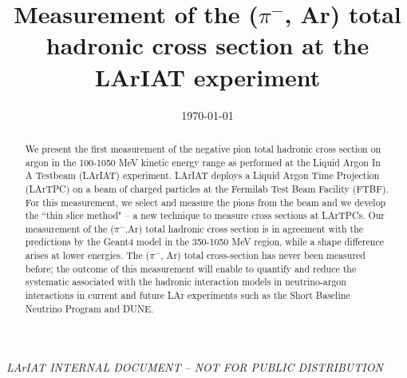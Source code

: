 \documentclass[aps,prl,twocolumn,showpacs,superscriptaddress,groupedaddress]{revtex4}  %
\begin{document}
\widetext
{}
\centerline{\em LArIAT INTERNAL DOCUMENT -- NOT FOR PUBLIC DISTRIBUTION}


\title{Measurement of the ($\pi^-$, Ar) total hadronic cross section at the LArIAT experiment}
\date{\today}


\begin{abstract}
We present the first measurement of the negative pion total hadronic cross section on argon in the 100-1050 MeV kinetic energy range as performed at the Liquid Argon In A Testbeam (LArIAT)  experiment. LArIAT deploys a Liquid Argon Time Projection (LArTPC) on a beam of charged particles at the Fermilab Test Beam Facility (FTBF). 
For this measurement, we select and measure the pions from the beam and we develop the ``thin slice method" --  a new technique to measure cross sections at LArTPCs.  Our measurement of the  ($\pi^-$,Ar) total hadronic cross section is in agreement with the predictions by the Geant4  model in the 350-1050 MeV region, while a shape difference arises at lower energies.
The ($\pi^-$, Ar) total cross-section has never been measured before; the outcome of this measurement will enable to quantify and reduce the systematic associated with the hadronic interaction models in neutrino-argon interactions in current and future LAr experiments such as the Short Baseline Neutrino Program and DUNE.\\

 \end{abstract}

\maketitle
\end{document}
